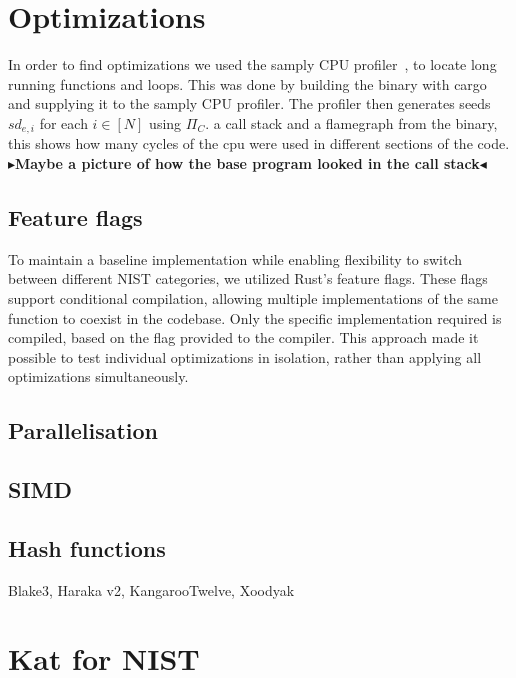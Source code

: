 \documentclass[twoside,11pt]{report}
\theoremstyle{definition}
\theoremstyle{plain}
\newcommand{\todo}[1]{{\color[rgb]{.5,0,0}\textbf{$\blacktriangleright$#1$\blacktriangleleft$}}}
\begin{document}

\section{Optimizations}
In order to find optimizations we used the samply CPU profiler~\cite{Stange2024mstange}, to locate long running functions and loops. This was done by building the binary with cargo and supplying it to the samply CPU profiler. The profiler then generates seeds $sd_{e,i}$ for each $i \in [N]$ using $\Pi_C$. a call stack and a flamegraph from the binary, this shows how many cycles of the cpu were used in different sections of the code.
\todo{Maybe a picture of how the base program looked in the call stack}

\subsection{Feature flags}\label{sub:feature_flags} %
To maintain a baseline implementation while enabling flexibility to switch between different NIST categories, we utilized Rust's feature flags. These flags support conditional compilation, allowing multiple implementations of the same function to coexist in the codebase. Only the specific implementation required is compiled, based on the flag provided to the compiler. This approach made it possible to test individual optimizations in isolation, rather than applying all optimizations simultaneously.


\subsection{Parallelisation}\label{sub:rayon} %


\subsection{SIMD}\label{sub:simd} %


\subsection{Hash functions}
Blake3, Haraka v2, KangarooTwelve, Xoodyak

\section{Kat for NIST}\label{sub:kat_for_nist} %
\end{document}
